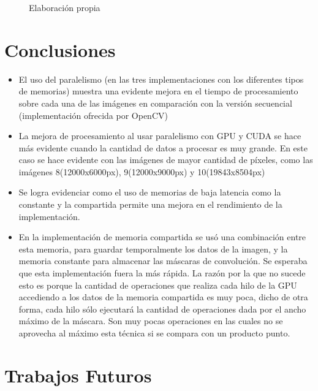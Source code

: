 \documentclass[10pt,journal,compsoc]{IEEEtran}
\begin{document}
\begin{figure}[ht]
\centering
    \hspace{0.1cm}
\caption{Elaboración propia}\label{fig:comp}
\end{figure}

\section{Conclusiones}

\begin{itemize}
\item El uso del paralelismo (en las tres implementaciones con los diferentes tipos de memorias) muestra una evidente mejora en el tiempo de procesamiento sobre cada una de las imágenes en comparación con la versión secuencial (implementación ofrecida por OpenCV)
\item La mejora de procesamiento al usar paralelismo con GPU y CUDA se hace más evidente cuando la cantidad de datos a procesar es muy grande. En este caso se hace evidente con las imágenes de mayor cantidad de píxeles, como las imágenes 8(12000x6000px), 9(12000x9000px) y 10(19843x8504px)
\item Se logra evidenciar como  el uso de memorias de baja latencia como la constante y la compartida permite una mejora en el rendimiento de la implementación. 
\item En la implementación de memoria compartida se usó una combinación entre esta memoria, para guardar temporalmente los datos de la imagen, y la memoria constante para almacenar las máscaras de convolución. Se esperaba que esta implementación fuera la más rápida. La razón por la que no sucede esto es porque la cantidad de operaciones que realiza cada hilo de la GPU accediendo a los datos de la memoria compartida es muy poca, dicho de otra forma, cada hilo sólo ejecutará la cantidad de operaciones dada por el ancho máximo de la máscara. Son muy pocas operaciones en las cuales no se aprovecha al máximo esta técnica si se compara con un producto punto.
\end{itemize}

\section{Trabajos Futuros}
\end{document}
